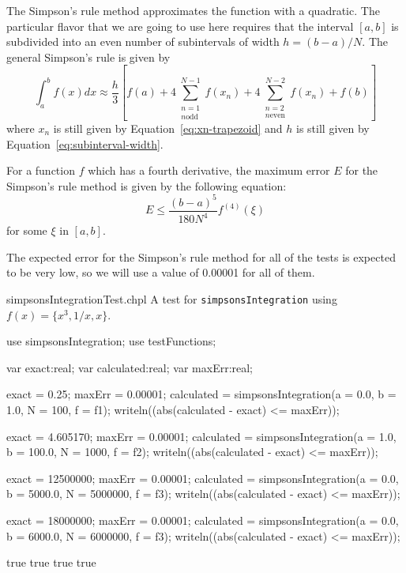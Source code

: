 \label{Simpsons_Integration}

The Simpson's rule method approximates the function with a quadratic. The particular flavor that
we are going to use here requires that the interval $[a,b]$ is subdivided into an even number of
subintervals of width $h=(b-a)/N$. 
The general Simpson's rule is given by
\begin{equation}
  \int_a^b f(x) dx \approx \frac{h}{3} \left[ f(a) + 
  4\sum_{\substack{n=1\\n \text{odd}}}^{N-1} f(x_n) + 
  4\sum_{\substack{n=2\\n \text{even}}}^{N-2} f(x_n) + 
  f(b) \right] \label{eq:simpsons}
\end{equation}
where $x_n$ is still given by Equation~\ref{eq:xn-trapezoid} and 
$h$ is still given by Equation~\ref{eq:subinterval-width}.

For a function $f$ which has a fourth derivative, the maximum error $E$ for the
Simpson's rule method is given by the following equation:
\begin{equation}
  E \leq \frac{(b-a)^5}{180 N^4} f^{(4)}(\xi) \label{eq:simpsons-max-error}
\end{equation}
for some $\xi$ in $[a,b]$.

The expected error for the Simpson's rule method for all of the tests is expected  
to be very low, so we will use a value of 0.00001 for all of them.

\begin{chapelexample}{simpsonsIntegrationTest.chpl}
  A test for \lstinline{simpsonsIntegration} using $f(x) = \{x^3, 1/x, x\}$.
  \begin{chapelpre}
  \end{chapelpre}
  \begin{chapel}
    use simpsonsIntegration;
    use testFunctions;

    var exact:real;
    var calculated:real;
    var maxErr:real;

    exact = 0.25;
    maxErr = 0.00001;
    calculated = simpsonsIntegration(a = 0.0, b = 1.0, N = 100, f = f1);
    writeln((abs(calculated - exact) <= maxErr));

    exact = 4.605170;
    maxErr = 0.00001;
    calculated = simpsonsIntegration(a = 1.0, b = 100.0, N = 1000, f = f2);
    writeln((abs(calculated - exact) <= maxErr));

    exact = 12500000;
    maxErr = 0.00001;
    calculated = simpsonsIntegration(a = 0.0, b = 5000.0, N = 5000000, f = f3);
    writeln((abs(calculated - exact) <= maxErr));

    exact = 18000000;
    maxErr = 0.00001;
    calculated = simpsonsIntegration(a = 0.0, b = 6000.0, N = 6000000, f = f3);
    writeln((abs(calculated - exact) <= maxErr));
  \end{chapel}
  \begin{chapelpost}
  \end{chapelpost}
  \begin{chapeloutput}
true
true
true
true
  \end{chapeloutput}
\end{chapelexample}

